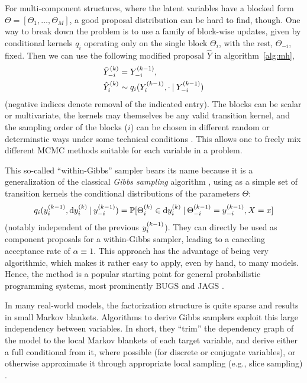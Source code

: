 For multi-component structures, where the latent variables have a blocked form
\(\Theta = [\Theta_1, \ldots, \Theta_M]\), a good proposal distribution can be hard to find, though.
One way to break down the problem is to use a family of block-wise updates, given by conditional
kernels \(q_{i}\) operating only on the single block \(\Theta_i\), with the rest, \(\Theta_{-i}\),
fixed.  Then we can use the following modified proposal \(\hat{Y}\) in algorithm~\ref{alg:mh},
\begin{equation}
  \label{eq:conditional-kernels}
  \begin{aligned}
    \kth[k]{\hat{Y}}_{-i} &= \kth[k-1]{Y}_{-i}, \\
    \kth[k]{\hat{Y}}_{i} &\from q_{i}(\kth[k-1]{Y}_{i}, \cdot \given \kth[k-1]{Y}_{-i})
  \end{aligned}
\end{equation}
(negative indices denote removal of the indicated entry).  The blocks can be scalar or multivariate,
the kernels may themselves be any valid transition kernel, and the sampling order of the blocks
(\(i\)) can be chosen in different random or determinstic ways under some technical conditions
\parencite[chapter 6.6]{vihola2020lectures}.  This allows one to freely mix different MCMC methods
suitable for each variable in a problem.

This so-called \enquote{within-Gibbs} sampler bears its name because it is a generalization of the
classical \emph{Gibbs sampling} algorithm \parencite{geman1984stochastic}, using as a simple set of
transition kernels the conditional distributions of the parameters \(\Theta\):
\begin{equation}
  \label{eq:gibbs-conditional-kernel}
  q_{i}(\kth[k-1]{y}_{i}, \dif \kth{y}_{i} \given \kth[k-1]{y}_{-i}) =
  \Prob{\kth{\Theta}_{i} \in \dif\kth{y}_{i} \given \kth[k-1]{\Theta}_{-i} = \kth[k-1]{y}_{-i}, X = x}
\end{equation}
(notably independent of the previous \(\kth[k-1]{y}_{i}\)).  They can directly be used as component
proposals for a within-Gibbs sampler, leading to a canceling acceptance rate of \(\alpha \equiv 1\).
This approach has the advantage of being very algorithmic, which makes it rather easy to apply, even
by hand, to many models.  Hence, the method is a popular starting point for general probabilistic
programming systems, most prominently BUGS \parencite{lunn2000winbugs,lunn2009bugs} and JAGS
\parencite{plummer2003jags,plummer2017jags}.

In many real-world models, the factorization structure is quite sparse and results in small Markov
blankets.  Algorithms to derive Gibbs samplers exploit this large independency between variables.
In short, they \enquote{trim} the dependency graph of the model to the local Markov blankets of each
target variable, and derive either a full conditional from it, where possible (for discrete or
conjugate variables), or otherwise approximate it through appropriate local sampling (e.g., slice
sampling) \parencite[see][]{plummer2003jags}.

